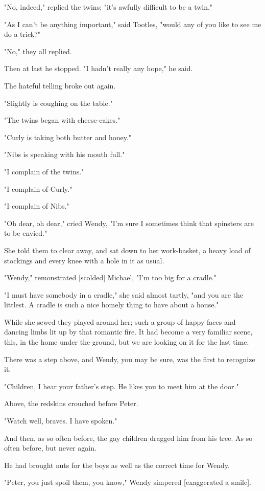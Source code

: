 "No, indeed," replied the twins; "it's awfully difficult to be a twin."


"As I can't be anything important," said Tootles, "would any of you like
to see me do a trick?"


"No," they all replied.


Then at last he stopped. "I hadn't really any hope," he said.


The hateful telling broke out again.


"Slightly is coughing on the table."


"The twins began with cheese-cakes."


"Curly is taking both butter and honey."


"Nibs is speaking with his mouth full."


"I complain of the twins."


"I complain of Curly."


"I complain of Nibs."


"Oh dear, oh dear," cried Wendy, "I'm sure I sometimes think that
spinsters are to be envied."


She told them to clear away, and sat down to her work-basket, a heavy load
of stockings and every knee with a hole in it as usual.


"Wendy," remonstrated [scolded] Michael, "I'm too big for a cradle."


"I must have somebody in a cradle," she said almost tartly, "and you are
the littlest. A cradle is such a nice homely thing to have about a house."


While she sewed they played around her; such a group of happy faces and
dancing limbs lit up by that romantic fire. It had become a very familiar
scene, this, in the home under the ground, but we are looking on it for
the last time.


There was a step above, and Wendy, you may be sure, was the first to
recognize it.


"Children, I hear your father's step. He likes you to meet him at the
door."


Above, the redskins crouched before Peter.


"Watch well, braves. I have spoken."


And then, as so often before, the gay children dragged him from his tree.
As so often before, but never again.


He had brought nuts for the boys as well as the correct time for Wendy.


"Peter, you just spoil them, you know," Wendy simpered [exaggerated a
smile].


